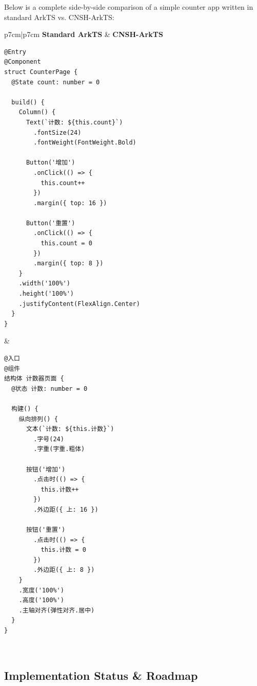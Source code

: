 Below is a complete side-by-side comparison of a simple counter app
written in standard ArkTS vs. CNSH-ArkTS:

\begin{table}[h]
\centering
\caption{CNSH-ArkTS vs. Standard ArkTS: Counter App}
\renewcommand{\arraystretch}{1.1}
\fontsize{8}{10}\selectfont
\begin{tabular}{p{7cm}|p{7cm}}
\toprule
\textbf{Standard ArkTS} & \textbf{CNSH-ArkTS} \\
\midrule
\begin{verbatim}
@Entry
@Component
struct CounterPage {
  @State count: number = 0

  build() {
    Column() {
      Text(`计数: ${this.count}`)
        .fontSize(24)
        .fontWeight(FontWeight.Bold)

      Button('增加')
        .onClick(() => {
          this.count++
        })
        .margin({ top: 16 })

      Button('重置')
        .onClick(() => {
          this.count = 0
        })
        .margin({ top: 8 })
    }
    .width('100%')
    .height('100%')
    .justifyContent(FlexAlign.Center)
  }
}
\end{verbatim}
&
\begin{verbatim}
@入口
@组件
结构体 计数器页面 {
  @状态 计数: number = 0

  构建() {
    纵向排列() {
      文本(`计数: ${this.计数}`)
        .字号(24)
        .字重(字重.粗体)

      按钮('增加')
        .点击时(() => {
          this.计数++
        })
        .外边距({ 上: 16 })

      按钮('重置')
        .点击时(() => {
          this.计数 = 0
        })
        .外边距({ 上: 8 })
    }
    .宽度('100%')
    .高度('100%')
    .主轴对齐(弹性对齐.居中)
  }
}
\end{verbatim}
\\
\bottomrule
\end{tabular}
\end{table}

\subsection{Implementation Status \& Roadmap}

